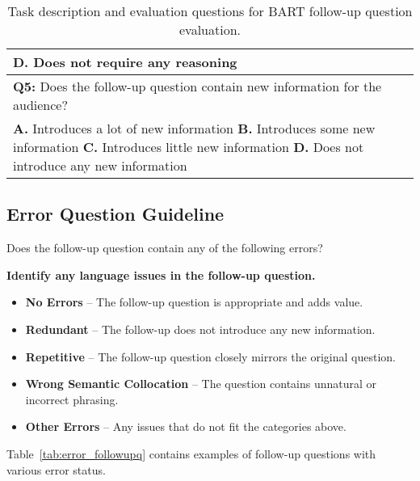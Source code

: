 \begin{table}[H]
\begin{tabular}{ p{\columnwidth} }
        \textbf{D.} Does not require any reasoning \\
        \midrule
        \textbf{Q5:} Does the follow-up question contain new information for the audience? \\
        \textbf{A.} Introduces a lot of new information \quad
        \textbf{B.} Introduces some new information \quad
        \textbf{C.} Introduces little new information \quad
        \textbf{D.} Does not introduce any new information \\
        \bottomrule
    \end{tabular}
    \caption{Task description and evaluation questions for BART follow-up question evaluation.}
    \label{tab:task_description_bart}
\end{table}

\subsection{Error Question Guideline}

\noindent Does the follow-up question contain any of the following errors?

\noindent \textbf{Identify any language issues in the follow-up question.}
\begin{itemize}
    \item \textbf{No Errors} – The follow-up question is appropriate and adds value.
    \item \textbf{Redundant} – The follow-up does not introduce any new information.
    \item \textbf{Repetitive} – The follow-up question closely mirrors the original question.
    \item \textbf{Wrong Semantic Collocation} – The question contains unnatural or incorrect phrasing.
    \item \textbf{Other Errors} – Any issues that do not fit the categories above.
\end{itemize}
Table~\ref{tab:error_followupq} contains examples of follow-up questions with various error status.

